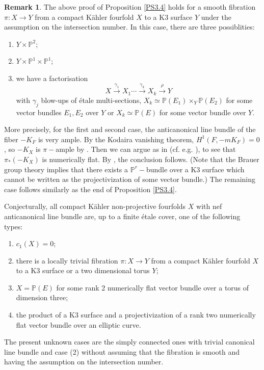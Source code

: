 \documentclass[a4, 12pt]{amsart}
\numberwithin{equation}{section}
\theoremstyle{definition}
\newtheorem{rem}[thm]{Remark}
\def\P{\mathbb{P}}
\def\P{\mathbb{P}}
\begin{document}
\begin{rem}
The above proof of Proposition \ref{PS3.4} holds for a smooth fibration $\pi:X \to Y$ from a compact K\"ahler fourfold $X$ to a K3 surface $Y$ under the assumption on the intersection number.
In this case, there are three possiblities:
\begin{enumerate}
\item $Y \times \P^2$;
\item $Y \times \P^1 \times \P^1$;
\item we have a factorisation
$$X \xrightarrow{\gamma_1} X_1 \cdots \xrightarrow{\gamma_k} X_k \xrightarrow{\rho}  Y$$
with $\gamma_j$ blow-ups of  \'etale multi-sections, $X_k \simeq \P(E_1) \times_{Y} \P(E_2)$ for some vector bundles $E_1,E_2$ over $Y$ or $X_k \simeq \P(E)$ for some vector bundle over $Y$.
\end{enumerate}
More precisely, for the first  and second case, the anticanonical line bundle of the fiber $-K_F$ is very ample.
By the Kodaira vanishing theorem,
$H^1(F, -mK_F)=0$, so $-K_X$ is $\pi-$ample by \cite[Theorem 4.2]{BS76}. 
Then we can argue as in \cite{CH19} (cf. e.g. \cite[Theorem 2.6]{MW23}), to see that $\pi_*(-K_X)$ is numerically flat.
By \cite[Proposition 2.5]{MW}, the conclusion follows.
(Note that the Brauer group theory implies that there exists a $\P^r-$bundle over a K3 surface which cannot be written as the projectivization of some vector bundle.)
The remaining case follows similarly as the end of Proposition \ref{PS3.4}.

Conjecturally, all compact K\"ahler non-projective fourfolds $X$ with nef anticanonical line bundle are, up to a finite \'etale cover, one of the following types:
\begin{enumerate}
\item $c_1(X)=0$;
\item there is a locally trivial fibration $\pi:X \to Y$ from a compact K\"ahler fourfold $X$ to a K3 surface or a two dimensional torus $Y$;
\item $X=\P(E)$ for some rank 2 numerically flat vector bundle over a torus of dimension three;
\item the product of a
K3 surface and a projectivization of a rank two numerically flat vector bundle over an
elliptic curve.
\end{enumerate}
The present unknown cases are the simply connected ones with trivial canonical line bundle and case (2) without assuming that the fibration is smooth and having the assumption on the intersection number.
\end{rem}
\end{document}
